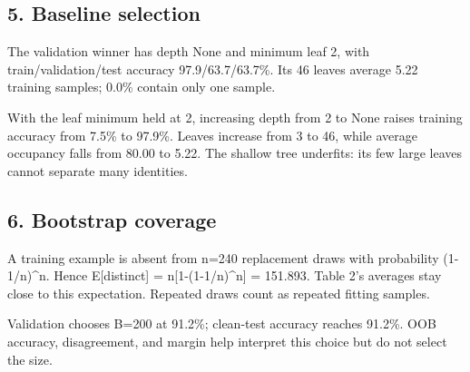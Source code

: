 \documentclass[10pt,twocolumn,letterpaper]{article}
\begin{document}
\subsection*{5. Baseline selection}
The validation winner has depth None and minimum leaf 2, with train/validation/test accuracy 97.9/63.7/63.7\%. Its 46 leaves average 5.22 training samples; 0.0\% contain only one sample.

With the leaf minimum held at 2, increasing depth from 2 to None raises training accuracy from 7.5\% to 97.9\%. Leaves increase from 3 to 46, while average occupancy falls from 80.00 to 5.22. The shallow tree underfits: its few large leaves cannot separate many identities.

\newpage
\subsection*{6. Bootstrap coverage}
A training example is absent from n=240 replacement draws with probability (1-1/n)\textasciicircum{}n. Hence E[distinct] = n[1-(1-1/n)\textasciicircum{}n] = 151.893. Table 2's averages stay close to this expectation. Repeated draws count as repeated fitting samples.

Validation chooses B=200 at 91.2\%; clean-test accuracy reaches 91.2\%. OOB accuracy, disagreement, and margin help interpret this choice but do not select the size.
\end{document}
